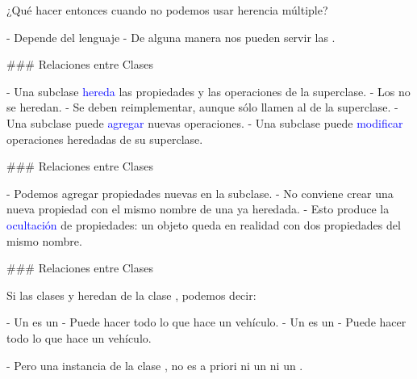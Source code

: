 
¿Qué hacer entonces cuando no podemos usar herencia múltiple?

- Depende del lenguaje
- De alguna manera nos pueden servir las .

### Relaciones entre Clases


- Una subclase \textcolor{blue}{hereda} las propiedades y las operaciones de la superclase.
    - Los  no se heredan.
    - Se deben reimplementar, aunque sólo llamen al de la superclase.
- Una subclase puede \textcolor{blue}{agregar} nuevas operaciones.
- Una subclase puede \textcolor{blue}{modificar} operaciones heredadas de su superclase.

### Relaciones entre Clases


- Podemos agregar propiedades nuevas en la subclase.
- No conviene crear una nueva propiedad con el mismo nombre de una ya heredada.
    - Esto produce la \textcolor{blue}{ocultación} de propiedades: un objeto queda en realidad con
    dos propiedades del mismo nombre.

### Relaciones entre Clases


Si las clases  y  heredan de la clase , podemos decir:

\vspace{-1em}
\columnsbegin


- Un  es un 
    - Puede hacer todo lo que hace un vehículo.
- Un  es un 
    - Puede hacer todo lo que hace un vehículo.

- Pero una instancia de la clase , no es a priori ni un  ni un .


\centering{}

\columnsend

